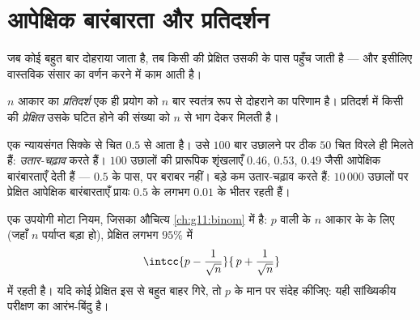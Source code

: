 \section{आपेक्षिक बारंबारता और प्रतिदर्शन}

जब कोई  बहुत बार दोहराया जाता है, तब किसी  की प्रेक्षित
 उसकी  के पास पहुँच जाती है --- और इसीलिए
 वास्तविक संसार का वर्णन करने में काम आती है।

\begin{definition}[प्रतिदर्श]\label{def:g10:proba:sample}
$n$ आकार का \emph{प्रतिदर्श} एक ही प्रयोग को $n$ बार
स्वतंत्र रूप से दोहराने का परिणाम है। प्रतिदर्श में किसी  की
\emph{प्रेक्षित } उसके घटित होने की संख्या को $n$ से भाग
देकर मिलती है।
\end{definition}

\begin{example}\label{ex:g10:proba:sampling}
एक न्यायसंगत सिक्के से चित  $0.5$ से आता है। उसे $100$ बार उछालने पर
ठीक $50$ चित विरले ही मिलते हैं:  \emph{उतार-चढ़ाव} करते हैं।
$100$ उछालों की प्रारूपिक शृंखलाएँ $0.46$, $0.53$, $0.49$ जैसी आपेक्षिक
बारंबारताएँ देती हैं --- $0.5$ के पास, पर बराबर नहीं। बड़े  कम
उतार-चढ़ाव करते हैं: $10\,000$ उछालों पर प्रेक्षित आपेक्षिक बारंबारताएँ प्रायः
$0.5$ के लगभग $0.01$ के भीतर रहती हैं।
\end{example}

\begin{remark}[उतार-चढ़ाव अंतराल]
एक उपयोगी मोटा नियम, जिसका औचित्य \cref{ch:g11:binom} में है:  $p$ वाली 
के $n$ आकार के  के लिए (जहाँ $n$ पर्याप्त बड़ा हो), प्रेक्षित
 लगभग $95\%$  में 
\[
\intcc{p - \frac{1}{\sqrt n}}{\,p + \frac{1}{\sqrt n}}
\]
में रहती है। यदि कोई प्रेक्षित  इस  से बहुत बाहर
गिरे, तो $p$ के मान पर संदेह कीजिए: यही सांख्यिकीय परीक्षण का आरंभ-बिंदु
है।
\end{remark}

